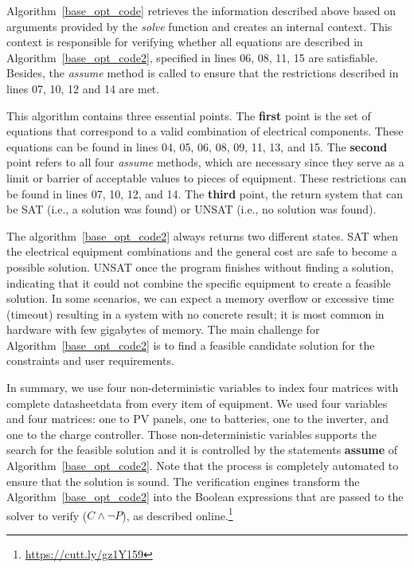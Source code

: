 \documentclass[journal]{IEEEtran}
\begin{document}
Algorithm~\ref{base_opt_code} retrieves the information described above based on arguments provided by the \textit{solve} function and creates an internal context. This context is responsible for verifying whether all equations are described in Algorithm~\ref{base_opt_code2}, specified in lines 06, 08, 11, 15 are satisfiable. Besides, the \textit{assume} method is called to ensure that the restrictions described in lines 07, 10, 12 and 14 are met.

This algorithm contains three essential points. The \textbf{first} point is the set of equations that correspond to a valid combination of electrical components. These equations can be found in lines 04, 05, 06, 08, 09, 11, 13, and 15. The \textbf{second} point refers to all four \textit{assume} methods, which are necessary since they serve as a limit or barrier of acceptable values to pieces of equipment. These restrictions can be found in lines 07, 10, 12, and 14. The \textbf{third} point, the return system that can be SAT (i.e., a solution was found) or UNSAT (i.e., no solution was found).

The algorithm~\ref{base_opt_code2} always returns two different states. SAT when the electrical equipment combinations and the general cost are safe to become a possible solution.  UNSAT once the program finishes without finding a solution, indicating that it could not combine the specific equipment to create a feasible solution. In some scenarios, we can expect a memory overflow or excessive time (timeout) resulting in a system with no concrete result; it is most common in hardware with few gigabytes of memory. The main challenge for Algorithm~\ref{base_opt_code2} is to find a feasible candidate solution for the constraints and user requirements.

In summary, we use four non-deterministic variables to index four matrices with complete datasheet\footnotemark[\value{footnote}] data from every item of equipment. We used four variables and four matrices: one to PV panels, one to batteries, one to the inverter, and one to the charge controller. Those non-deterministic variables supports the search for the feasible solution and it is controlled by the statements \textbf{assume} of Algorithm~\ref{base_opt_code2}. Note that the process is completely automated to ensure that the solution is sound. The verification engines transform the Algorithm~\ref{base_opt_code2} into the Boolean expressions that are passed to the solver to verify ($C \wedge \neg P$), as described online.\footnote{\href{https://cutt.ly/gz1Y159}{https://cutt.ly/gz1Y159}}
\end{document}

